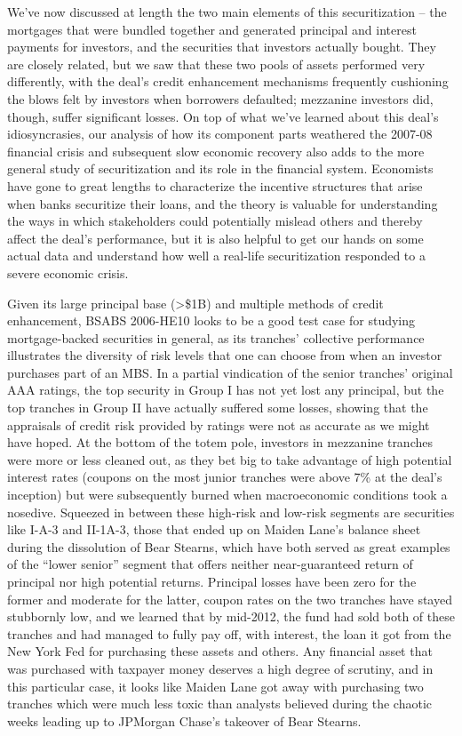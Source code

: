 \documentclass[12pt]{article}
\begin{document}
We’ve now discussed at length the two main elements of this securitization – the mortgages that were bundled together and generated principal and interest payments for investors, and the securities that investors actually bought. They are closely related, but we saw that these two pools of assets performed very differently, with the deal’s credit enhancement mechanisms frequently cushioning the blows felt by investors when borrowers defaulted; mezzanine investors did, though, suffer significant losses. On top of what we’ve learned about this deal’s idiosyncrasies, our analysis of how its component parts weathered the 2007-08 financial crisis and subsequent slow economic recovery also adds to the more general study of securitization and its role in the financial system. Economists have gone to great lengths to characterize the incentive structures that arise when banks securitize their loans, and the theory is valuable for understanding the ways in which stakeholders could potentially mislead others and thereby affect the deal’s performance, but it is also helpful to get our hands on some actual data and understand how well a real-life securitization responded to a severe economic crisis.

Given its large principal base (>\$1B) and multiple methods of credit enhancement, BSABS 2006-HE10 looks to be a good test case for studying mortgage-backed securities in general, as its tranches’ collective performance illustrates the diversity of risk levels that one can choose from when an investor purchases part of an MBS. In a partial vindication of the senior tranches’ original AAA ratings, the top security in Group I has not yet lost any principal, but the top tranches in Group II have actually suffered some losses, showing that the appraisals of credit risk provided by ratings were not as accurate as we might have hoped. At the bottom of the totem pole, investors in mezzanine tranches were more or less cleaned out, as they bet big to take advantage of high potential interest rates (coupons on the most junior tranches were above 7\% at the deal’s inception) but were subsequently burned when macroeconomic conditions took a nosedive. Squeezed in between these high-risk and low-risk segments are securities like I-A-3 and II-1A-3, those that ended up on Maiden Lane’s balance sheet during the dissolution of Bear Stearns, which have both served as great examples of the “lower senior” segment that offers neither near-guaranteed return of principal nor high potential returns. Principal losses have been zero for the former and moderate for the latter, coupon rates on the two tranches have stayed stubbornly low, and we learned that by mid-2012, the fund had sold both of these tranches and had managed to fully pay off, with interest, the loan it got from the New York Fed for purchasing these assets and others. Any financial asset that was purchased with taxpayer money deserves a high degree of scrutiny, and in this particular case, it looks like Maiden Lane got away with purchasing two tranches which were much less toxic than analysts believed during the chaotic weeks leading up to JPMorgan Chase’s takeover of Bear Stearns.
\end{document}
